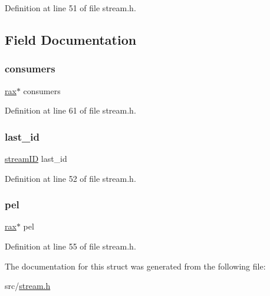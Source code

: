 Definition at line 51 of file stream.\+h.



\subsection{Field Documentation}
\mbox{\label{structstream_c_g_a7773ab32d924c957c1db3ba8986cb963}} 
\subsubsection{\texorpdfstring{consumers}{consumers}}
{\footnotesize\ttfamily \hyperlink{structrax}{rax}$\ast$ consumers}



Definition at line 61 of file stream.\+h.

\mbox{\label{structstream_c_g_aaa32df2db581ba299a258cdc0db8e907}} 
\subsubsection{\texorpdfstring{last\+\_\+id}{last\_id}}
{\footnotesize\ttfamily \hyperlink{structstream_i_d}{stream\+ID} last\+\_\+id}



Definition at line 52 of file stream.\+h.

\mbox{\label{structstream_c_g_a2fc8aed22096d11568cb29885cf08cb2}} 
\subsubsection{\texorpdfstring{pel}{pel}}
{\footnotesize\ttfamily \hyperlink{structrax}{rax}$\ast$ pel}



Definition at line 55 of file stream.\+h.



The documentation for this struct was generated from the following file\+:\begin{DoxyCompactItemize}
\item 
src/\hyperlink{stream_8h}{stream.\+h}\end{DoxyCompactItemize}
